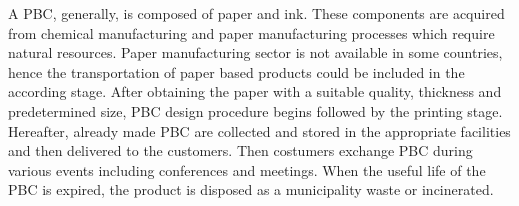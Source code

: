\documentclass[conference]{IEEEtran}
\begin{document}
A PBC, generally, is composed of paper and ink. These components are acquired from chemical manufacturing and paper manufacturing processes which require natural resources. Paper manufacturing sector is not available in some countries, hence the transportation of paper based products could be included in the according stage. After obtaining the paper with a suitable quality, thickness and predetermined size, PBC design procedure begins followed by the printing stage. Hereafter, already made PBC are collected and stored in the appropriate facilities and then delivered to the customers. Then costumers exchange PBC during various events including conferences and meetings. When the useful life of the PBC is expired, the product is disposed as a municipality waste or incinerated.   

\end{document}
